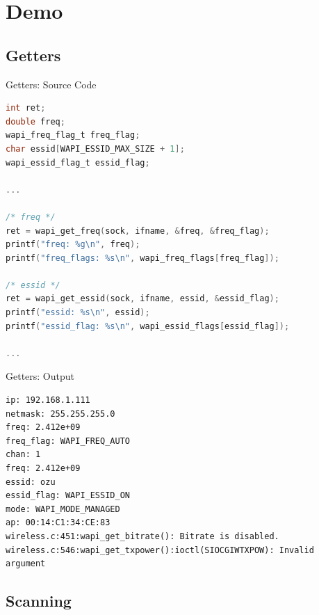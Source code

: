 \documentclass[turkish,12pt,red,compress,mathserif]{beamer}
\begin{document}

\section{Demo}


\subsection{Getters}

\begin{frame}[fragile]{Getters: Source Code}
  \begin{lstlisting}[language=c]
int ret;
double freq;
wapi_freq_flag_t freq_flag;
char essid[WAPI_ESSID_MAX_SIZE + 1];
wapi_essid_flag_t essid_flag;

...

/* freq */
ret = wapi_get_freq(sock, ifname, &freq, &freq_flag);
printf("freq: %g\n", freq);
printf("freq_flags: %s\n", wapi_freq_flags[freq_flag]);

/* essid */
ret = wapi_get_essid(sock, ifname, essid, &essid_flag);
printf("essid: %s\n", essid);
printf("essid_flag: %s\n", wapi_essid_flags[essid_flag]);

...
  \end{lstlisting}
\end{frame}

\begin{frame}[fragile]{Getters: Output}
  \begin{lstlisting}
ip: 192.168.1.111
netmask: 255.255.255.0
freq: 2.412e+09
freq_flag: WAPI_FREQ_AUTO
chan: 1
freq: 2.412e+09
essid: ozu
essid_flag: WAPI_ESSID_ON
mode: WAPI_MODE_MANAGED
ap: 00:14:C1:34:CE:83
wireless.c:451:wapi_get_bitrate(): Bitrate is disabled.
wireless.c:546:wapi_get_txpower():ioctl(SIOCGIWTXPOW): Invalid argument
  \end{lstlisting}
\end{frame}


\subsection{Scanning}
\end{document}
